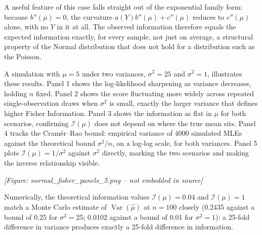 A useful feature of this case falls straight out of the exponential family form: because $b''(\mu)=0$, the curvature $a(Y)b''(\mu)+c''(\mu)$ reduces to $c''(\mu)$ alone, with no $Y$ in it at all. The observed information therefore equals the expected information exactly, for every sample, not just on average, a structural property of the Normal distribution that does not hold for a distribution such as the Poisson.

A simulation with $\mu=5$ under two variances, $\sigma^2=25$ and $\sigma^2=1$, illustrates these results. Panel 1 shows the log-likelihood sharpening as variance decreases, holding $n$ fixed. Panel 2 shows the score fluctuating more widely across repeated single-observation draws when $\sigma^2$ is small, exactly the larger variance that defines higher Fisher Information. Panel 3 shows the information as flat in $\mu$ for both scenarios, confirming $\mathcal{I}(\mu)$ does not depend on where the true mean sits. Panel 4 tracks the Cram\'er--Rao bound: empirical variance of 4000 simulated MLEs against the theoretical bound $\sigma^2/n$, on a log-log scale, for both variances. Panel 5 plots $\mathcal{I}(\mu)=1/\sigma^2$ against $\sigma^2$ directly, marking the two scenarios and making the inverse relationship visible.

\begin{center}
\textit{[Figure: normal\_fisher\_panels\_5.png -- not embedded in source]}
\end{center}

Numerically, the theoretical information values $\mathcal{I}(\mu)=0.04$ and $\mathcal{I}(\mu)=1$ match a Monte Carlo estimate of $\operatorname{Var}(\hat\mu)$ at $n=100$ closely (0.2435 against a bound of 0.25 for $\sigma^2=25$; 0.0102 against a bound of 0.01 for $\sigma^2=1$): a 25-fold difference in variance produces exactly a 25-fold difference in information.
